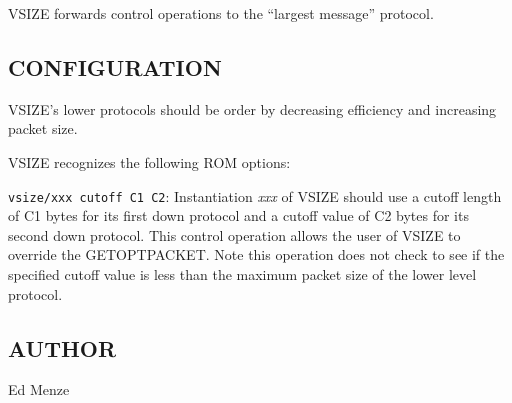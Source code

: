 VSIZE forwards control operations to the ``largest message'' protocol.

\subsection*{CONFIGURATION}

VSIZE's lower
protocols should be order by decreasing efficiency and increasing 
packet size. 

\bigskip

\noindent
VSIZE recognizes the following ROM options:

\smallskip

{\tt vsize/xxx cutoff C1 C2}: Instantiation {\em xxx} of VSIZE 
should use a cutoff length of C1 bytes for its first down protocol
and a cutoff value of C2 bytes for its second down protocol. 
This control operation allows the user of VSIZE to override the 
GETOPTPACKET.  Note this operation does not check to see if 
the specified cutoff value is less than the maximum packet size 
of the lower level protocol.  

\subsection*{AUTHOR}

\noindent Ed Menze
